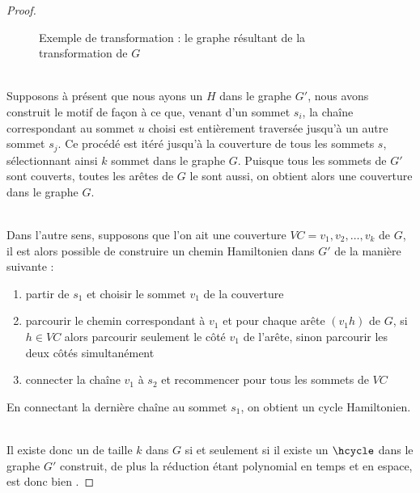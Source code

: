 \begin{proof}
    \begin{figure}
        \begin{center}
            \begin{tikzpicture}[scale=0.6, every node/.style={transform shape}, tmp/.style={inner
                    sep=0mm, node distance=3mm}]
                
            \end{tikzpicture}
            \caption{Exemple de transformation : le graphe résultant de la transformation de $G$}
            \label{hcycle_finish}
        \end{center}
    \end{figure}


    ~\\
    Supposons à présent que nous ayons un \hcycle $H$ dans le graphe $G'$, nous avons construit le
    motif de façon à ce que, venant d'un sommet $s_i$, la chaîne correspondant au sommet $u$ choisi
    est entièrement traversée jusqu'à un autre sommet $s_j$. Ce procédé est itéré jusqu'à la
    couverture de tous les sommets $s$, sélectionnant ainsi $k$ sommet dans le graphe $G$. Puisque
    tous les sommets de $G'$ sont couverts, toutes les arêtes de $G$ le sont aussi, on obtient alors
    une couverture dans le graphe $G$.

    ~\\
    Dans l'autre sens, supposons que l'on ait une couverture $VC = {v_1, v_2, \dots, v_k}$ de $G$,
    il est alors possible de construire un chemin Hamiltonien dans $G'$ de la manière suivante :
    \begin{enumerate}
        \item partir de $s_1$ et choisir le sommet $v_1$ de la couverture
        \item parcourir le chemin correspondant à $v_1$ et pour chaque arête $(v_1h)$ de $G$, si $h
            \in VC$ alors parcourir seulement le côté $v_1$ de l'arête, sinon parcourir les deux
            côtés simultanément
        \item connecter la chaîne $v_1$ à $s_2$ et recommencer pour tous les sommets de $VC$
    \end{enumerate}
    En connectant la dernière chaîne au sommet $s_1$, on obtient un cycle Hamiltonien.

    ~\\
    Il existe donc un \vcover de taille $k$ dans $G$ si et seulement si il existe un $\hcycle$ dans
    le graphe $G'$ construit, de plus la réduction étant polynomial en temps et en espace, \hcycle
    est donc bien \npc.

\end{proof}


